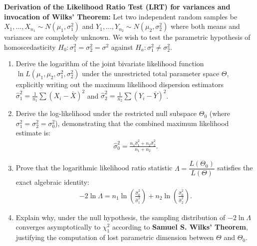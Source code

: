 \begin{problema}
	\label{prob:doc_desaf_lrt_wilks}
	\textbf{Derivation of the Likelihood Ratio Test (LRT) for variances and invocation of Wilks' Theorem:}
	Let two independent random samples be $X_1, \dots, X_{n_1} \sim N(\mu_1, \sigma_1^2)$ and $Y_1, \dots, Y_{n_2} \sim N(\mu_2, \sigma_2^2)$ where both means and variances are completely unknown. We wish to test the parametric hypothesis of homoscedasticity $H_0: \sigma_1^2 = \sigma_2^2 = \sigma^2$ against $H_a: \sigma_1^2 \neq \sigma_2^2$.
	\begin{enumerate}
		\item Derive the logarithm of the joint bivariate likelihood function $\ln L(\mu_1, \mu_2, \sigma_1^2, \sigma_2^2)$ under the unrestricted total parameter space $\Theta$, explicitly writing out the maximum likelihood dispersion estimators $\hat{\sigma}_1^2 = \frac{1}{n_1}\sum (X_i - \bar{X})^2$ and $\hat{\sigma}_2^2 = \frac{1}{n_2}\sum (Y_i - \bar{Y})^2$.
		\item Derive the log-likelihood under the restricted null subspace $\Theta_0$ (where $\sigma_1^2 = \sigma_2^2 = \sigma_0^2$), demonstrating that the combined maximum likelihood estimate is:
		\begin{align}
			\hat{\sigma}_0^2 = \frac{n_1 \hat{\sigma}_1^2 + n_2 \hat{\sigma}_2^2}{n_1 + n_2}.
		\end{align}
		\item Prove that the logarithmic likelihood ratio statistic $\Lambda = \dfrac{L(\Theta_0)}{L(\Theta)}$ satisfies the exact algebraic identity:
		\begin{align}
			-2 \ln \Lambda = n_1 \ln\left( \frac{\hat{\sigma}_0^2}{\hat{\sigma}_1^2} \right) + n_2 \ln\left( \frac{\hat{\sigma}_0^2}{\hat{\sigma}_2^2} \right).
		\end{align}
		\item Explain why, under the null hypothesis, the sampling distribution of $-2 \ln \Lambda$ converges asymptotically to $\chi^2_1$ according to \textbf{Samuel S. Wilks' Theorem}, justifying the computation of lost parametric dimension between $\Theta$ and $\Theta_0$.
	\end{enumerate}
\end{problema}

